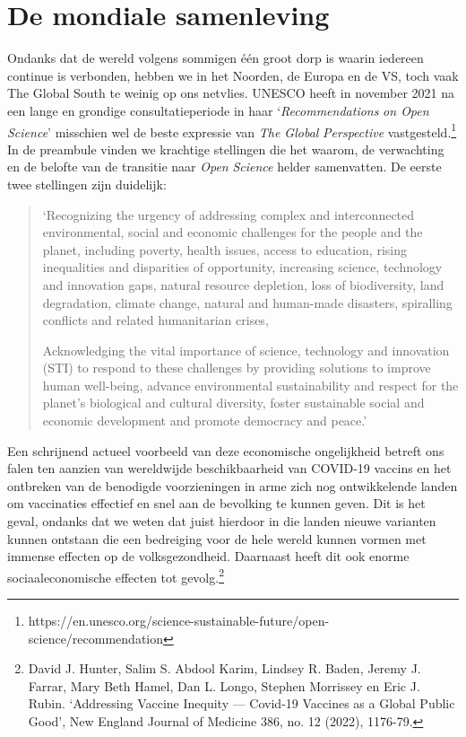 \documentclass[smallauthor, chapterhaspagenum, nochapterinheader, pagenuminheader,  bigchapnum,medium2, tocpages,  garamond, titleinheader]{jote-book}
\begin{document}
	\section{De mondiale samenleving}



	Ondanks dat de wereld volgens sommigen één groot dorp is waarin iedereen continue is verbonden, hebben we in het Noorden, de Europa en de VS, toch vaak The Global South te weinig op ons netvlies. UNESCO heeft in november 2021 na een lange en grondige consultatieperiode in haar ‘\emph{Recommendations}\emph{ on Open }\emph{Science}' misschien wel de beste expressie van \emph{The Global }\emph{Perspective} vastgesteld.\footnote{https://en.unesco.org/science-sustainable-future/open-science/recommendation} In de preambule vinden we krachtige stellingen die het waarom, de verwachting en de belofte van de transitie naar \emph{Open }\emph{Science} helder samenvatten. De eerste twee stellingen zijn duidelijk:

	\begin{quote}
		\itshape

		‘Recognizing the urgency of addressing complex and interconnected environmental, social and economic challenges for the people and the planet, including poverty, health issues, access to education, rising inequalities and disparities of opportunity, increasing science, technology and innovation gaps, natural resource depletion, loss of biodiversity, land degradation, climate change, natural and human-made disasters, spiralling conflicts and related humanitarian crises,

		\vspace*{\baselineskip}

		Acknowledging the vital importance of science, technology and innovation (STI) to respond to these challenges by providing solutions to improve human well-being, advance environmental sustainability and respect for the planet's biological and cultural diversity, foster sustainable social and economic development and promote democracy and peace.'
	\end{quote}

	Een schrijnend actueel voorbeeld van deze economische ongelijkheid betreft ons falen ten aanzien van wereldwijde beschikbaarheid van COVID-19 vaccins en het ontbreken van de benodigde voorzieningen in arme zich nog ontwikkelende landen om vaccinaties effectief en snel aan de bevolking te kunnen geven. Dit is het geval, ondanks dat we weten dat juist hierdoor in die landen nieuwe varianten kunnen ontstaan die een bedreiging voor de hele wereld kunnen vormen met immense effecten op de volksgezondheid. Daarnaast heeft dit ook enorme sociaaleconomische effecten tot gevolg.\footnote{David J. Hunter, Salim S. Abdool Karim, Lindsey R. Baden, Jeremy J. Farrar, Mary Beth Hamel, Dan L. Longo, Stephen Morrissey en Eric J. Rubin. ‘Addressing Vaccine Inequity — Covid-19 Vaccines as a Global Public Good', New England Journal of Medicine 386, no. 12 (2022), 1176-79. }
\end{document}
